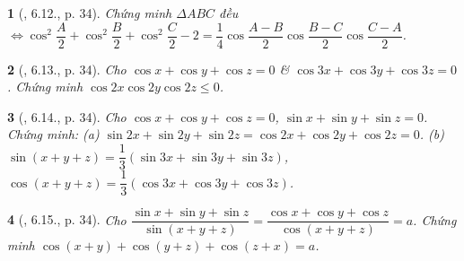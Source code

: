 \documentclass{article}
\newtheorem{baitoan}{}
\begin{document}
\begin{baitoan}[\cite{Hung_nang_cao_phat_trien_Toan_11_tap_1}, 6.12., p. 34]
	Chứng minh $\Delta ABC$ đều $\Leftrightarrow\cos^2\dfrac{A}{2} + \cos^2\dfrac{B}{2} + \cos^2\dfrac{C}{2} - 2 = \dfrac{1}{4}\cos\dfrac{A - B}{2}\cos\dfrac{B - C}{2}\cos\dfrac{C - A}{2}$.
\end{baitoan}

\begin{baitoan}[\cite{Hung_nang_cao_phat_trien_Toan_11_tap_1}, 6.13., p. 34]
	Cho $\cos x + \cos y + \cos z = 0$ \& $\cos3x + \cos3y + \cos3z = 0$. Chứng minh $\cos2x\cos2y\cos2z\le0$.
\end{baitoan}

\begin{baitoan}[\cite{Hung_nang_cao_phat_trien_Toan_11_tap_1}, 6.14., p. 34]
	Cho $\cos x + \cos y + \cos z = 0$, $\sin x + \sin y + \sin z = 0$. Chứng minh: (a) $\sin2x + \sin2y + \sin2z = \cos2x + \cos2y + \cos2z = 0$. (b) $\sin(x + y + z) = \dfrac{1}{3}(\sin3x + \sin3y + \sin3z)$, $\cos(x + y + z) = \dfrac{1}{3}(\cos3x + \cos3y + \cos3z)$.
\end{baitoan}

\begin{baitoan}[\cite{Hung_nang_cao_phat_trien_Toan_11_tap_1}, 6.15., p. 34]
	Cho $\dfrac{\sin x + \sin y + \sin z}{\sin(x + y + z)} = \dfrac{\cos x + \cos y + \cos z}{\cos(x + y + z)} = a$. Chứng minh $\cos(x + y) + \cos(y + z) + \cos(z + x) = a$.
\end{baitoan}


\printbibliography[heading=bibintoc]
	
\end{document}
